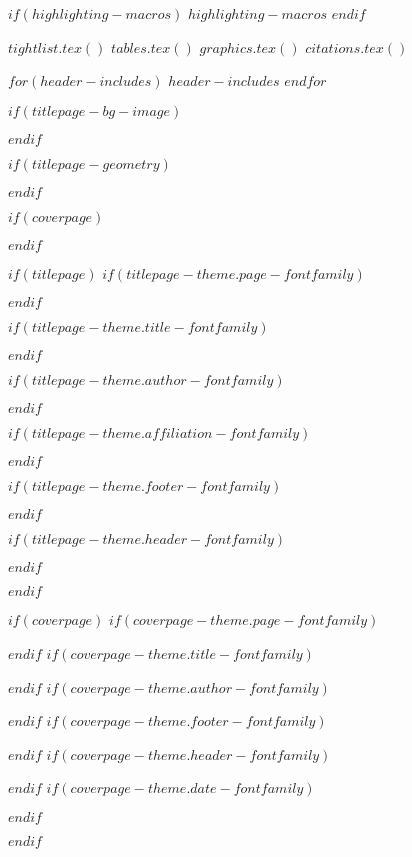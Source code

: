 $if(highlighting-macros)$
$highlighting-macros$
$endif$

$tightlist.tex()$
$tables.tex()$
$graphics.tex()$
$citations.tex()$

$for(header-includes)$
$header-includes$
$endfor$

\usepackage{hyphenat}
\usepackage{ifthen}
\usepackage{calc}
\usepackage{calculator}

$if(titlepage-bg-image)$
\usepackage{graphicx}
\usepackage{wallpaper}
$endif$

$if(titlepage-geometry)$
\usepackage{geometry}
$endif$

$if(coverpage)$
\usepackage{graphicx}
\usepackage{geometry}
\usepackage{afterpage}
\usepackage{tikz}
\usetikzlibrary{calc}
\usetikzlibrary{fadings}
$endif$

$if(titlepage)$
$if(titlepage-theme.page-fontfamily)$
\usepackage{fontspec}
$endif$

$if(titlepage-theme.title-fontfamily)$
\usepackage{fontspec}
$endif$

$if(titlepage-theme.author-fontfamily)$
\usepackage{fontspec}
$endif$

$if(titlepage-theme.affiliation-fontfamily)$
\usepackage{fontspec}
$endif$

$if(titlepage-theme.footer-fontfamily)$
\usepackage{fontspec}
$endif$

$if(titlepage-theme.header-fontfamily)$
\usepackage{fontspec}
$endif$

$endif$

$if(coverpage)$
$if(coverpage-theme.page-fontfamily)$
\usepackage{fontspec}
$endif$
$if(coverpage-theme.title-fontfamily)$
\usepackage{fontspec}
$endif$
$if(coverpage-theme.author-fontfamily)$
\usepackage{fontspec}
$endif$
$if(coverpage-theme.footer-fontfamily)$
\usepackage{fontspec}
$endif$
$if(coverpage-theme.header-fontfamily)$
\usepackage{fontspec}
$endif$
$if(coverpage-theme.date-fontfamily)$
\usepackage{fontspec}
$endif$

$endif$

